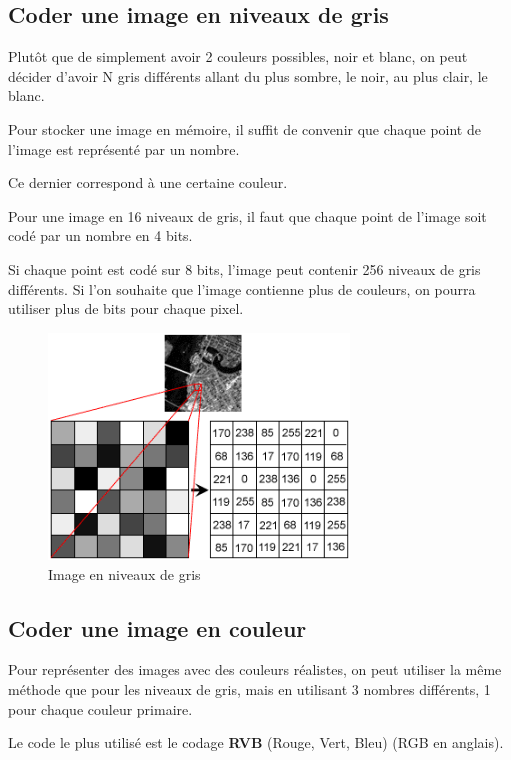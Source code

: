\documentclass[11pt, a4paper]{book}
\begin{document}
\subsection{Coder une image en niveaux de gris}

Plutôt que de simplement avoir 2 couleurs possibles, noir et blanc, on peut décider d'avoir N gris différents allant du plus sombre, le noir, au plus clair, le blanc.

Pour stocker une image en mémoire, il suffit de convenir que chaque point de l’image est représenté par un nombre. 

Ce dernier correspond à une certaine couleur.

Pour une image en 16 niveaux de gris, il faut que chaque point de l’image soit codé par un nombre en 4 bits.

Si chaque point est codé sur 8 bits, l’image peut contenir 256 niveaux de gris différents. Si l'on souhaite que l'image contienne plus de couleurs, on pourra utiliser plus de bits pour chaque pixel.


\begin{center}
\begin{figure}[H]
\centering
\includegraphics[width=8cm]{images/grayscale}
\caption{Image en niveaux de gris}
\end{figure}
\end{center}


\subsection{Coder une image en couleur}

Pour représenter des images avec des couleurs réalistes, on peut utiliser la même méthode que pour les niveaux de gris, mais en utilisant 3 nombres différents, 1 pour chaque couleur primaire.

Le code le plus utilisé est le codage {\bf RVB} (Rouge, Vert, Bleu) (RGB en anglais). 
\end{document}
